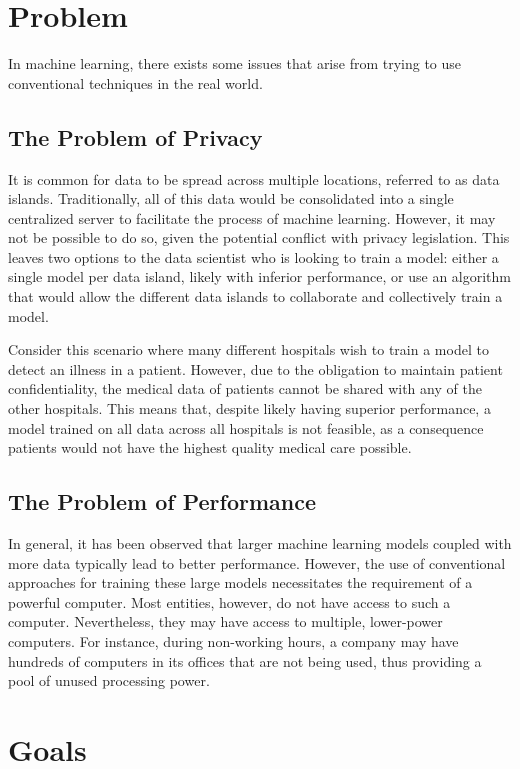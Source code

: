 \section{Problem}
In machine learning, there exists some issues that arise from trying to use conventional techniques in the real world.

\subsection{The Problem of Privacy}
It is common for data to be spread across multiple locations, referred to as data islands. Traditionally, all of this data would be consolidated into a single centralized server to facilitate the process of machine learning. However, it may not be possible to do so, given the potential conflict with privacy legislation. This leaves two options to the data scientist who is looking to train a model: either a single model per data island, likely with inferior performance, or use an algorithm that would allow the different data islands to collaborate and collectively train a model.

Consider this scenario where many different hospitals wish to train a model to detect an illness in a patient. However, due to the obligation to maintain patient confidentiality, the medical data of patients cannot be shared with any of the other hospitals. This means that, despite likely having superior performance, a model trained on all data across all hospitals is not feasible, as a consequence patients would not have the highest quality medical care possible.

\subsection{The Problem of Performance}
In general, it has been observed that larger machine learning models coupled with more data typically lead to better performance. However, the use of conventional approaches for training these large models necessitates the requirement of a powerful computer. Most entities, however, do not have access to such a computer. Nevertheless, they may have access to multiple, lower-power computers. For instance, during non-working hours, a company may have hundreds of computers in its offices that are not being used, thus providing a pool of unused processing power.

\section{Goals}

